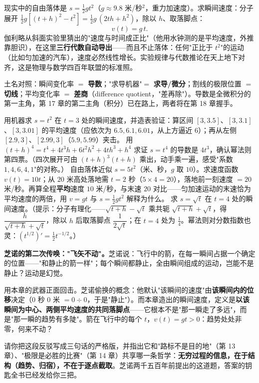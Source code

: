 现实中的自由落体是 $s = \tfrac12 g t^2$（$g \approx 9.8$ 米/秒$^2$，重力加速度）。求瞬间速度：分子展开 $\tfrac12 g\left[(t+h)^2 - t^2\right] = \tfrac12 g\,(2th + h^2)$，除以 $h$、取落脚点：
\[
v(t) = g\,t .
\]
伽利略从斜面实验里猜出的"速度与时间成正比"（他用水钟测的是平均速度，外推靠胆识），在这里\textbf{三行代数自动导出}——而且不止落体：任何"正比于 $t^2$"的运动（比如匀加速的汽车），速度必然线性增长。实验规律与代数推论在天上地下对齐，这是物理与数学四百年联盟的标准照。

\begin{cidian}
土名对照：瞬间变化率 $=$ \textbf{导数}；"求导机器"$=$ \textbf{求导/微分}；割线的极限位置 $=$ \textbf{切线}；平均变化率 $=$ \textbf{差商}（difference quotient，"差再除"）。导数是全微积分的第一主角，第 17 章的第二主角（积分）已在路上，两者将在第 18 章握手。
\end{cidian}

\begin{dongshou}
\begin{itemize}
  \yisi 用机器求 $s = t^2$ 在 $t = 3$ 处的瞬间速度，并造表验证：算区间 $[3, 3.5]$、$[3, 3.1]$、$[3, 3.01]$ 的平均速度（应依次为 $6.5, 6.1, 6.01$，从上方逼近 $6$）；再从左侧 $[2.9, 3]$、$[2.99, 3]$（$5.9, 5.99$）夹击。
  \yier 用 $(t+h)^4 = t^4 + 4t^3h + 6t^2h^2 + 4th^3 + h^4$ 求证 $s = t^4$ 的导数是 $4t^3$，确认幂法则第四票。（四次展开可由 $(t+h)^3(t+h)$ 乘出，动手乘一遍，感受"系数 $1, 4, 6, 4, 1$"的对称。）
  \yier 自由落体近似 $s = 5t^2$（米、秒，$g$ 取 $10$）。求速度函数 $v(t) = 10t$；从 $20$ 米高处落地需 $t = 2$ 秒（$5\times4 = 20$），落地前一刻速度 $= 20$ 米/秒。再算全程\textbf{平均}速度 $10$ 米/秒，与末速 $20$ 对比——匀加速运动的末速恰为平均速度的两倍，用 $v = gt$ 与 $s = \tfrac12 gt^2$ 解释为什么。
  \yier 求 $s = \sqrt t$ 在 $t = 4$ 处的瞬间速度。（提示：分子有理化——$\sqrt{t+h} - \sqrt t$ 乘共轭 $\sqrt{t+h}+\sqrt t$，得 $\dfrac{h}{\sqrt{t+h}+\sqrt t}$，除以 $h$ 后取落脚点 $\dfrac{1}{2\sqrt t}$；在 $t=4$ 处为 $\tfrac14$。幂法则对分数指数也灵：$(t^{1/2})' = \tfrac12 t^{-1/2}$。）
\end{itemize}
\end{dongshou}

\begin{shaonao}
\textbf{芝诺的第二次传唤："飞矢不动"。}芝诺说：飞行中的箭，在每一瞬间占据一个确定的位置——"和静止的箭一样"；每个瞬间都静止，全由瞬间组成的运动，岂能不是静止？运动是幻觉。

用本章的武器正面回击。芝诺偷换的概念：他默认"该瞬间的速度"由\textbf{该瞬间内的位移}决定（$0$ 秒 $0$ 米 $= 0\div0$，于是"静止"）。而本章造出的瞬间速度，定义是\textbf{以该瞬间为中心、两侧平均速度的共同落脚点}——它根本不是"那一瞬走了多远"，而是"那一瞬的趋势有多陡"。箭在飞行中的每个 $t$，$v(t) = gt > 0$：趋势处处非零，何来不动？

请你把这段反驳写成三句话的严格版，并指出它和"路标不是目的地"（第 13 章）、"极限是必胜的比赛"（第 14 章）共享哪一条哲学：\textbf{无穷过程的信息，在于结构（趋势、归宿），不在于逐点截取}。芝诺两千五百年前提出的这道题，答案的钥匙全书已经发给你三把。
\end{shaonao}

